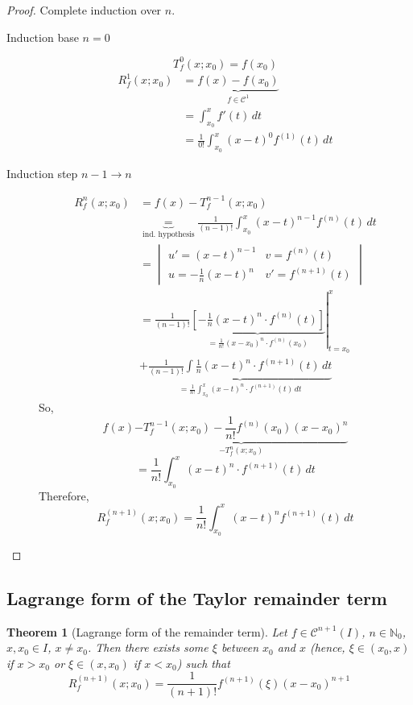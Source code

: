\documentclass{article}
\newtheorem{theorem}{Theorem}  \numberwithin{theorem}{section}
\begin{document}
\begin{proof}
  Complete induction over $n$.
  \begin{description}
    \item[Induction base $n = 0$]
      \[ T_f^0(x; x_0) = f(x_0) \]
      \begin{align*}
        R_f^1(x; x_0) &= \underbrace{f(x) - f(x_0)}_{f \in \mathcal C^1} \\
          &= \int_{x_0}^x f'(t) \, dt \\
          &= \frac1{0!} \int_{x_0}^x (x - t)^0 f^{(1)}(t) \, dt
      \end{align*}
    \item[Induction step $n-1 \to n$]
      \begin{align*}
        R_f^n(x; x_0) &= f(x) - T_f^{n-1}(x; x_0) \\
          &\underbrace{=}_{\text{ind. hypothesis}} \frac{1}{(n-1)!} \int_{x_0}^x (x - t)^{n-1} f^{(n)}(t) \, dt \\
          &= \begin{vmatrix} u' = (x - t)^{n-1} & v = f^{(n)}(t) \\ u = -\frac1n (x - t)^n & v' = f^{(n+1)}(t) \end{vmatrix} \\
          &= \left.\frac{1}{(n-1)!} \underbrace{\left[-\frac1n (x - t)^n \cdot f^{(n)}(t)\right]}_{= \frac1{n!} (x - x_0)^n \cdot f^{(n)}(x_0)} \right|_{t = x_0}^{x} \\
          &+ \underbrace{\frac{1}{(n-1)!} \int \frac1n (x - t)^n \cdot f^{(n+1)}(t) \, dt}_{= \frac1{n!} \int_{x_0}^x (x - t)^n \cdot f^{(n+1)}(t) \, dt}
      \end{align*}
      So,
      \[ f(x) \underbrace{- T_f^{n-1}(x; x_0) - \frac{1}{n!} f^{(n)}(x_0)(x - x_0)^n}_{- T_f^n(x; x_0)} \]
      \[ = \frac1{n!} \int_{x_0}^x (x - t)^n \cdot f^{(n+1)}(t) \, dt \]
      Therefore,
      \[ R_f^{(n+1)}(x; x_0) = \frac{1}{n!} \int_{x_0}^x (x - t)^n f^{(n+1)}(t) \, dt \]
  \end{description}
\end{proof}

\subsection{Lagrange form of the Taylor remainder term}

\begin{theorem}[Lagrange form of the remainder term] %
  \label{thm5}
  Let $f \in \mathcal C^{n+1}(I)$, $n \in \mathbb N_0$, $x, x_0 \in I$, $x \neq x_0$.
  Then there exists some $\xi$ between $x_0$ and $x$ (hence, $\xi \in (x_0, x)$ if $x > x_0$ or $\xi \in (x, x_0)$ if $x < x_0$) such that
  \[ R_f^{(n+1)}(x; x_0) = \frac{1}{(n+1)!} f^{(n+1)}(\xi) (x - x_0)^{n+1} \]
\end{theorem}
\end{document}
